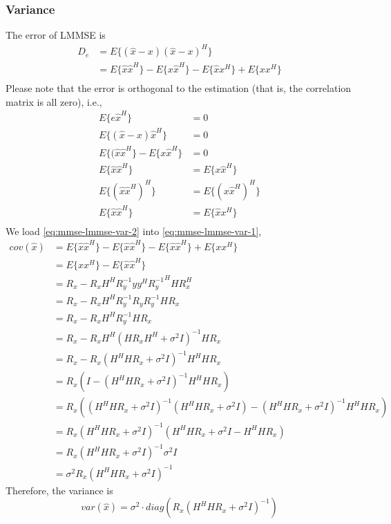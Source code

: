 \documentclass{article}
\begin{document}
\subsubsection{Variance}
The error of LMMSE is
\begin{equation}
\begin{split}
D_e &= E\{(\hat{x} - x)(\hat{x} - x)^H \}\\
&= E\{\hat{x}\hat{x}^H\} - E\{x\hat{x}^H\} - E\{\hat{x}x^H\} + E\{xx^H\} \\
\end{split}
\label{eq:mmse-lmmse-var-1}
\end{equation}
Please note that the error is orthogonal to the estimation (that is, the correlation matrix is all zero), i.e.,
\begin{equation}
\begin{split}
E\{e\hat{x}^H\} &= 0 \\
E\{(\hat{x} - x)\hat{x}^H\} &= 0 \\
E\{(\hat{x}\hat{x}^H\} - E\{x\hat{x}^H\} &= 0 \\
E\{\hat{x}\hat{x}^H\} &= E\{x\hat{x}^H\} \\
E\{(\hat{x}\hat{x}^H)^H\} &= E\{(x\hat{x}^H)^H\} \\
E\{\hat{x}\hat{x}^H\} &= E\{\hat{x}x^H\} \\
\end{split}
\label{eq:mmse-lmmse-var-2}
\end{equation}
We load \eqref{eq:mmse-lmmse-var-2} into \eqref{eq:mmse-lmmse-var-1},
\begin{equation}
\begin{split}
cov(\hat{x}) &= E\{\hat{x}\hat{x}^H\} - E\{\hat{x}\hat{x}^H\} - E\{\hat{x}\hat{x}^H\} + E\{xx^H\} \\
&= E\{xx^H\} - E\{\hat{x}\hat{x}^H\} \\
&= R_x - R_xH^HR_y^{-1}y y^H {R_y^{-1}}^HHR_x^H \\
&= R_x - R_xH^HR_y^{-1}R_yR_y^{-1}HR_x \\
&= R_x - R_xH^HR_y^{-1}HR_x \\
&= R_x - R_xH^H (HR_xH^H + \sigma^2I)^{-1} HR_x \\
&= R_x - R_x(H^HHR_x + \sigma^2I)^{-1}H^H HR_x \\
&= R_x(I - (H^HHR_x + \sigma^2I)^{-1}H^H HR_x) \\
&= R_x((H^HHR_x + \sigma^2I)^{-1}(H^HHR_x + \sigma^2I) - (H^HHR_x + \sigma^2I)^{-1}H^H HR_x) \\
&= R_x(H^HHR_x + \sigma^2I)^{-1}(H^HHR_x + \sigma^2I - H^H HR_x)\\
&= R_x(H^HHR_x + \sigma^2I)^{-1}\sigma^2I \\
&= \sigma^2R_x(H^HHR_x + \sigma^2I)^{-1}
\end{split}
\end{equation}
Therefore, the variance is
\begin{equation}
var(\hat{x}) = \sigma^2\cdot diag(R_x(H^HHR_x + \sigma^2I)^{-1})
\end{equation}
\end{document}
